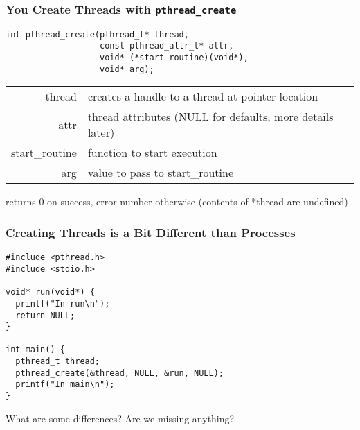   \begin{frame}[fragile]
    \frametitle{You Create Threads with \texttt{pthread\_create}}

    \begin{lstlisting}
int pthread_create(pthread_t* thread, 
                   const pthread_attr_t* attr,
                   void* (*start_routine)(void*),
                   void* arg);
    \end{lstlisting}

    \vspace{1em}

    \begin{tabular}{rl}
      thread & creates a handle to a thread at pointer location \\

      attr & thread attributes (NULL for defaults, more details later) \\

      start\_routine & function to start execution \\

      arg & value to pass to start\_routine \\
    \end{tabular}

    \vspace{2em}
    
    returns 0 on success, error number otherwise (contents of *thread are
    undefined)
  \end{frame}

  \begin{frame}[fragile]
    \frametitle{Creating Threads is a Bit Different than Processes}

    \begin{lstlisting}
#include <pthread.h>
#include <stdio.h>

void* run(void*) {
  printf("In run\n");
  return NULL;
}

int main() {
  pthread_t thread;
  pthread_create(&thread, NULL, &run, NULL);
  printf("In main\n");
}
    \end{lstlisting}

    \vspace{2em}

    What are some differences? Are we missing anything?
  \end{frame}

